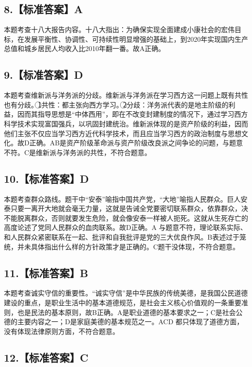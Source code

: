 \documentclass[UTF8,11pt]{ctexart}
\begin{document}
\subsection*{8.【标准答案】A}

本题考查十八大报告内容。十八大指出：为确保实现全面建成小康社会的宏伟目标，在发展平衡性、协调性、可持续性明显增强的基础上，到2020年实现国内生产总值和城乡居民人均收入比2010年翻一番。故A正确。


\subsection*{9.【标准答案】D}

本题考查维新派与洋务派的分歧。维新派与洋务派在学习西方这一问题上既有共性也有分歧。\textcircled{1}共性：都主张向西方学习。\textcircled{2}分歧：洋务派代表的是地主阶级的利益，因而其指导思想是“中体西用”，即在不改变封建制度的情况下，通过学习西方科学技术实现富国强兵，以巩固封建统治。维新派体现的是资产阶级的利益，因而他们主张不仅应当学习西方近代科学技术，而且应当学习西方的政治制度与思想文化。故D正确。AB是资产阶级革命派与资产阶级改良派之间争论的问题，与题意不符。C是维新派与洋务派的共性，不符合题意。


\subsection*{10.【标准答案】D}

本题考查群众路线。题干中“安泰”喻指中国共产党，“大地”喻指人民群众。巨人安泰只要一离开大地就会毫无力量，这就是告诫全党要密切联系群众，依靠群众，决不能脱离群众，否则就要发生危险，就会像安泰一样被人扼死。这就从生死存亡的高度论述了党同人民群众的血肉联系。故D正确。A 与题意不符，理论联系实际、和人民群众紧密联系在一起、批评和自我批评是党的三大优良作风。B表述过于笼统，并未具体指出什么样的方针政策才是正确的。C题干没体现，不符合题意。


\subsection*{11.【标准答案】B}

本题考查诚实守信的重要性。“诚实守信”是中华民族的传统美德，是我国公民道德建设的重点，是职业生活中的基本道德规范，是社会主义核心价值观的一条重要准则，也是民法的基本原则，故B正确。A是职业道德的基本要求之一；C是社会公德的主要内容之一；D是家庭美德的基本规范之一。ACD 都只体现了道德方面，没有体现法律原则方面，不符合题意。


\subsection*{12.【标准答案】C}
\end{document}
